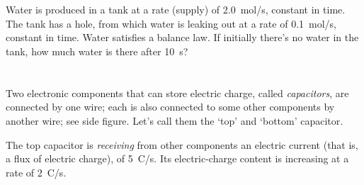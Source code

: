 \documentclass[a4paper,12pt,%
onecolumn,oneside,%
british%
]{memoir}
\renewcommand*{\|}[1][]{\nonscript\:#1\vert\nonscript\:\mathopen{}}
\begin{document}
\section{}
\label{sec:calc_from_bal2-watertank}

Water is produced in a tank at a rate (supply) of \qty{2.0}{mol/s}, constant in time. The tank has a hole, from which water is leaking out at a rate of \qty{0.1}{mol/s}, constant in time. Water satisfies a balance law. If initially there's no water in the tank, how much water is there after \qty{10}{s}?

\section{}
\label{sec:calc_from_bal2-capacitors}
Two electronic components that can store electric charge, called \emph{capacitors}, are connected by one wire; each is also connected to some other components by another wire; see side figure. Let's call them the \enquote*{top} and \enquote*{bottom} capacitor.

%
The top capacitor is \emph{receiving} from other components an electric current (that is, a flux of electric charge), of \qty{5}{C/s}. Its electric-charge content is increasing at a rate of \qty{2}{C/s}.
\end{document}
